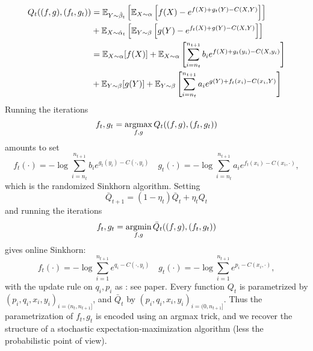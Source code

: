 \documentclass[a4paper, 10pt]{article}
\begin{document}
\begin{align}
    Q_t((f, g), (f_t, g_t)) &= \mathbb{E}_{Y \sim \hat \beta_t} \left[ \mathbb{E}_{X \sim \alpha} \left[
        f(X) - e^{f(X) + g_t(Y) - C(X, Y)} \right] \right] \\
        &+
        \mathbb{E}_{X \sim \hat \alpha_t} \left[ \mathbb{E}_{Y \sim \beta} \left[
        g(Y) - e^{f_t(X) + g(Y) - C(X, Y)} \right] \right] \\
        &= \mathbb{E}_{X \sim \alpha} [f(X)] + \mathbb{E}_{X \sim \alpha} \left[ \sum_{i=n_t}^{n_{t+1}} 
        b_i e^{f(X) + g_t(y_i) - C(X, y_i)} \right] \\
        &+ \mathbb{E}_{Y \sim \beta} [g(Y)] + \mathbb{E}_{Y \sim \beta} \left[ \sum_{i=n_t}^{n_{t+1}} 
        a_i e^{g(Y) + f_t(x_i) - C(x_i, Y)} \right]
\end{align}
Running the iterations
\begin{equation}
    f_t, g_t = \operatorname*{argmax}_{f,g} Q_t((f, g), (f_t, g_t))
\end{equation}
amounts to set
\begin{equation}
    f_t(\cdot) = - \log \sum_{i=n_t}^{n_{t+1}} b_i e^{g_t(y_i) - C(\cdot, y_i)} \quad
    g_t(\cdot) = - \log \sum_{i=n_t}^{n_{t+1}} a_i e^{f_t(x_i) - C(x_i, \cdot)},
\end{equation}
which is the randomized Sinkhorn algorithm. Setting
\begin{equation}
    \bar Q_{t+1} = (1 - \eta_t) \bar Q_{t} + \eta_t Q_{t}
\end{equation}
and running the iterations
\begin{equation}
    f_t, g_t = \operatorname*{argmin}_{f,g} \bar Q_t((f, g), (f_t, g_t))
\end{equation}
gives online Sinkhorn:
\begin{equation}
    f_t(\cdot) = - \log \sum_{i=1}^{n_{t+1}} e^{q_i - C(\cdot, y_i)} \quad
    g_t(\cdot) = - \log \sum_{i=1}^{n_{t+1}} e^{p_i - C(x_i, \cdot)},
\end{equation}
with the update rule on $q_i, p_i$ as : see paper.
Every function $Q_t$ is parametrized by $(p_i, q_i, x_i, y_i)_{i=(n_t,
 n_{t+1}]}$, and $\bar Q_t$ by $(p_i, q_i, x_i, y_i)_{i=(0, n_{t+1}]}$. Thus the
 parametrization of $f_t, g_t$ is encoded using an argmax trick, and we recover the structure of a stochastic expectation-maximization algorithm (less the probabilistic point of view).


\printbibliography
\end{document}
